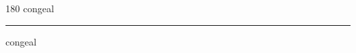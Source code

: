 
\begin{frame}
\begin{center}
\begin{turn}{180}
{\fontsize{2.5cm}{1em}\selectfont congeal}
\end{turn}
\vspace{1em}\par  
\hrule
\vspace{1em}\par  
{\fontsize{2.5cm}{1em}\selectfont congeal}
\end{center}
\end{frame}
